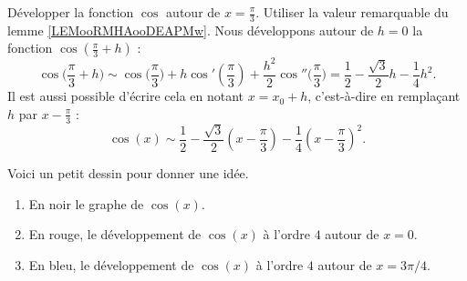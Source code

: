 \begin{example}     \label{developcosenpisur3}
	Développer la fonction \( \cos\) autour de \( x=\frac{ \pi }{ 3 }\). Utiliser la valeur remarquable du lemme \ref{LEMooRMHAooDEAPMw}. Nous développons autour de \( h=0\) la fonction \( \cos(\frac{ \pi }{ 3 }+h)\) :
	\begin{equation}
		\cos\big( \frac{ \pi }{ 3 }+h \big)\sim \cos\big( \frac{ \pi }{ 3 } \big)+h\cos'(\frac{ \pi }{ 3 })+\frac{ h^2 }{2}\cos''\big( \frac{ \pi }{ 3 } \big)=\frac{ 1 }{2}-\frac{ \sqrt{3} }{2}h-\frac{1}{ 4 }h^2.
	\end{equation}
	Il est aussi possible d'écrire cela en notant \( x=x_0+h\), c'est-à-dire en remplaçant \( h\) par \( x-\frac{ \pi }{ 3 }\) :
	\begin{equation}
		\cos(x)\sim\frac{ 1 }{2}-\frac{ \sqrt{3} }{ 2 }(x-\frac{ \pi }{ 3 })-\frac{1}{ 4 }(x-\frac{ \pi }{ 3 })^2.
	\end{equation}
\end{example}

\begin{normaltext}
Voici un petit dessin pour donner une idée.
\begin{center}
	
\end{center}
\begin{enumerate}
    \item
        En noir le graphe de \( \cos(x)\).
    \item
        En rouge, le développement de \( \cos(x)\) à l'ordre \( 4\) autour de \( x=0\).
    \item
        En bleu, le développement de \( \cos(x)\) à l'ordre \( 4\) autour de \( x=3\pi/4\).
\end{enumerate}
\end{normaltext}
